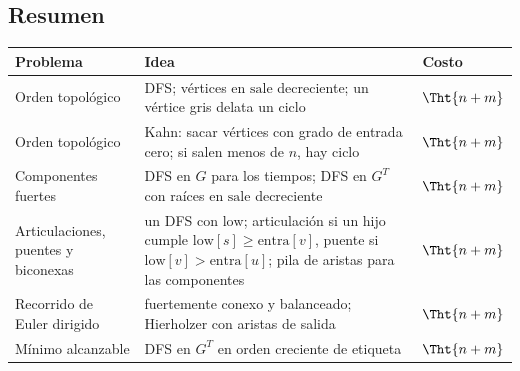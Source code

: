 \documentclass[11pt,letterpaper]{article}
\begin{document}

\subsection*{Resumen}

\begin{center}
\small
\begin{tabular}{>{\raggedright\arraybackslash}p{3.4cm}
                >{\raggedright\arraybackslash}p{8.2cm}l}
  \toprule
  \textbf{Problema} & \textbf{Idea} & \textbf{Costo} \\
  \midrule
  Orden topológico & DFS; vértices en $\text{sale}$ decreciente; un
    vértice gris delata un ciclo & $\Tht{n + m}$ \\
  \addlinespace
  Orden topológico & Kahn: sacar vértices con grado de entrada cero;
    si salen menos de $n$, hay ciclo & $\Tht{n + m}$ \\
  \addlinespace
  Componentes fuertes & DFS en $G$ para los tiempos; DFS en $G^T$ con
    raíces en $\text{sale}$ decreciente & $\Tht{n + m}$ \\
  \addlinespace
  Articulaciones, puentes y biconexas & un DFS con $\text{low}$;
    articulación si un hijo cumple $\text{low}[s] \ge
    \text{entra}[v]$, puente si $\text{low}[v] > \text{entra}[u]$;
    pila de aristas para las componentes & $\Tht{n + m}$ \\
  \addlinespace
  Recorrido de Euler dirigido & fuertemente conexo y balanceado;
    Hierholzer con aristas de salida & $\Tht{n + m}$ \\
  \addlinespace
  Mínimo alcanzable & DFS en $G^T$ en orden creciente de etiqueta
    & $\Tht{n + m}$ \\
  \bottomrule
\end{tabular}
\end{center}

\newpage


\label{sec:mst}
\end{document}
